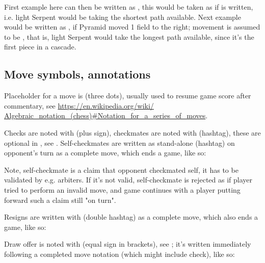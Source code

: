 First example here can then be written as , this would be taken as if
 is written, i.e. light Serpent would be taking the shortest path
available. Next example would be written as , if Pyramid moved 1 field
to the right; movement is assumed to be\newline
\alg{[Sc3.d2.e3.f2.g3.f4.g5.f6.e5.d6.c5.b6.c7]}\newline
\alg{\~{}[Ac7-d7]}, that is, light Serpent would take the longest path available,
since it's the first piece in a cascade.

\subsection*{Move symbols, annotations}
\label{sec:Appendix/Notation/Move symbols, annotations}

Placeholder for a move is  (three dots), usually used to resume game score
after commentary, see\newline
\href{https://en.wikipedia.org/wiki/Algebraic\_notation\_(chess)\#Notation\_for\_a\_series\_of\_moves}
{https://en.wikipedia.org/wiki/\newline
Algebraic\_notation\_(chess)\#Notation\_for\_a\_series\_of\_moves}.

Checks are noted with \alg{+} (plus sign), checkmates are noted with \alg{\#} (hashtag),
these are optional in , see . Self-checkmates are written
as stand-alone \alg{\#} (hashtag) on opponent's turn as a complete move, which ends
a game, like so:

\algcycpar
{}
\algcycparend

Note, self-checkmate is a claim that opponent checkmated self, it has to be validated
by e.g. arbiters. If it's not valid, self-checkmate is rejected as if player tried to
perform an invalid move, and game continues with a player putting forward such a claim
still "on turn".

Resigns are written with \alg{\#\#} (double hashtag) as a complete move, which also
ends a game, like so:

\algcycpar
{}
\algcycparend

Draw offer is noted with \alg{(=)} (equal sign in brackets), see ;
it's written immediately following a completed move notation (which might include check),
like so:

